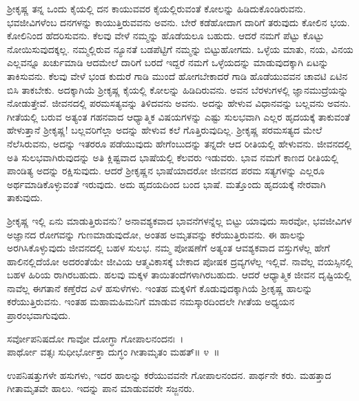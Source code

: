 ಶ‍್ರೀಕೃಷ್ಣ ತನ್ನ ಒಂದು ಕೈಯಲ್ಲಿ ದನ ಕಾಯುವವರ ಕೈಯಲ್ಲಿರುವಂತೆ ಕೋಲನ್ನು ಹಿಡಿದು\-ಕೊಂಡಿರುವನು. ಭವಜೀವಿಗಳೆಂಬ ದನಗಳನ್ನು ಕಾಯುತ್ತಿರುವವನು ಅವನು. ಬೇರೆ ಕಡೆ\break ಹೋದಾಗ ದಾರಿಗೆ ತರುವುದು ಕೋಲಿನ ಭಯ. ಕೋಲಿನಿಂದ ಹೆದರಿಸುವನು. ಕೆಲವು ವೇಳೆ ನಮ್ಮನ್ನು ಹೊಡೆಯಲೂ ಬಹುದು. ಆದರೆ ನಮಗೆ ಪೆಟ್ಟು ಕೊಟ್ಟು ನೋಯಿಸುವುದಕ್ಕಲ್ಲ. ನಮ್ಮಲ್ಲಿರುವ ನ್ಯೂನತೆ ಬಡಪೆಟ್ಟಿಗೆ ನಮ್ಮನ್ನು ಬಿಟ್ಟುಹೋಗದು. ಒಳ್ಳೆಯ ಮಾತು, ನಯ, ವಿನಯ ಎಲ್ಲವನ್ನೂ ಖರ್ಚುಮಾಡಿ ಆದಮೇಲೆ ದಾರಿಗೆ ಬರದೆ ಇದ್ದರೆ ನಮಗೆ ಒಳ್ಳೆಯದನ್ನು ಮಾಡುವುದಕ್ಕಾಗಿ ಏಟನ್ನು ತಾಕಿಸುವನು. ಕೆಲವು ವೇಳೆ ಭಂಡ ಕುದುರೆ ಗಾಡಿ ಮುಂದೆ ಹೋಗಬೇಕಾದರೆ ಗಾಡಿ ಹೊಡೆಯುವವನ ಚಾವಟಿ ಏಟಿನ ಬಿಸಿ ತಾಕಬೇಕು. ಅದಕ್ಕಾಗಿಯೆ ಶ‍್ರೀಕೃಷ್ಣ ಕೈಯಲ್ಲಿ ಕೋಲನ್ನು ಹಿಡಿದಿರುವನು. ಅವನ ಬೆರಳುಗಳಲ್ಲಿ ಜ್ಞಾನಮುದ್ರೆಯನ್ನು ನೋಡುತ್ತೇವೆ. ಜೀವನದಲ್ಲಿ ಪರಮಸತ್ಯವನ್ನು ತಿಳಿದವನು ಅವನು. ಅದನ್ನು ಹೇಳುವ ವಿಧಾನವನ್ನು ಬಲ್ಲವನು ಅವನು. ಗೀತೆಯಲ್ಲಿ ಬರುವ ಅತ್ಯಂತ ಗಹನವಾದ ಆಧ್ಯಾತ್ಮಿಕ ವಿಷಯಗಳನ್ನು ಎಷ್ಟು ಸುಲಭವಾಗಿ ಎಲ್ಲರ ಹೃದಯಕ್ಕೆ ತಾಕುವಂತೆ ಹೇಳುತ್ತಾನೆ ಶ‍್ರೀಕೃಷ್ಣ! ಬಲ್ಲವರಿಗೆಲ್ಲಾ ಅದನ್ನು ಹೇಳುವ ಕಲೆ ಗೊತ್ತಿರುವುದಿಲ್ಲ. ಶ‍್ರೀಕೃಷ್ಣ ಪರಮಸತ್ಯದ ಮೇಲೆ ನೆಲೆಸಿರುವನು, ಅದನ್ನು ಇತರರೂ ಪಡೆಯುವುದು ಹೇಗೆಂಬುದನ್ನು ತನ್ನದೇ ಆದ ರೀತಿಯಲ್ಲಿ ಹೇಳುವನು. ಜೀವನದಲ್ಲಿ ಅತಿ ಸುಲಭವಾಗಿರುವುದನ್ನು ಅತಿ ಕ್ಲಿಷ್ಟವಾದ ಭಾಷೆಯಲ್ಲಿ ಕೆಲವರು ಇಡುವರು. ಭಾವ ನಮಗೆ ಕಾಣದ ರೀತಿಯಲ್ಲಿ ಪಾಂಡಿತ್ಯ ಅದನ್ನು ರಕ್ಷಿಸುವುದು. ಆದರೆ ಶ‍್ರೀಕೃಷ್ಣನ ಭಾಷೆಯಾದರೋ ಜೀವನದ ಪರಮ ಸತ್ಯಗಳನ್ನು ಎಲ್ಲರೂ ಅರ್ಥಮಾಡಿಕೊಳ್ಳುವಂತೆ ಇರುವುದು. ಅದು ಹೃದಯದಿಂದ ಬಂದ ಭಾಷೆ. ಮತ್ತೊಂದು ಹೃದಯಕ್ಕೆ ನೇರವಾಗಿ ತಾಕುವುದು.

\newpage

ಶ‍್ರೀಕೃಷ್ಣ ಇಲ್ಲಿ ಏನು ಮಾಡುತ್ತಿರುವನು? ಅನಾವಶ್ಯಕವಾದ ಭಾವನೆಗಳನ್ನೆಲ್ಲ ಬಿಟ್ಟು ಯಾವುದು ಸಾರವೋ, ಭವಜೀವಿಗಳ ಅಜ್ಞಾನದ ರೋಗವನ್ನು ಗುಣಮಾಡುವುದೋ, ಅಂತಹ ಅಮೃತವನ್ನು ಕರೆಯುತ್ತಿರುವನು. ಈ ಹಾಲನ್ನು ಅರಗಿಸಿಕೊಳ್ಳುವುದು ಜೀವನದಲ್ಲಿ ಬಹಳ ಸುಲಭ. ನಮ್ಮ ಪೋಷಣೆಗೆ ಅತ್ಯಂತ ಆವಶ್ಯಕವಾದ ವಸ್ತುಗಳೆಲ್ಲ ಹೇಗೆ ಹಾಲಿನಲ್ಲಿದೆಯೋ ಅದರಂತೆಯೇ ಜೀವಿಯ ಆತ್ಮವಿಕಾಸಕ್ಕೆ ಬೇಕಾದ ಪೋಷಕ ದ್ರವ್ಯಗಳೆಲ್ಲ ಇಲ್ಲಿವೆ. ನಾವೆಲ್ಲ ವಯಸ್ಸಿನಲ್ಲಿ ಬಹಳ ಹಿರಿಯ ರಾಗಿರಬಹುದು. ಹಲವು ಮಕ್ಕಳ ತಾಯಿತಂದೆಗಳಾಗಿರಬಹುದು. ಆದರೆ ಆಧ್ಯಾತ್ಮಿಕ ಜೀವನ ದೃಷ್ಟಿಯಲ್ಲಿ ನಾವೆಲ್ಲ ಈಗತಾನೆ ಕಣ್ತೆರೆದ ಎಳೆ ಹಸುಳೆಗಳು. ಇಂತಹ ಮಕ್ಕಳಿಗೆ ಕೊಡುವುದಕ್ಕಾಗಿಯೆ ಶ‍್ರೀಕೃಷ್ಣ ಹಾಲನ್ನು ಕರೆಯುತ್ತಿರುವನು. ಇಂತಹ ಮಹಾಮಹಿಮನಿಗೆ ಮಾಡುವ ನಮಸ್ಕಾರದಿಂದಲೇ ಗೀತೆಯ ಅಧ್ಯಯನ ಪ್ರಾರಂಭವಾಗುವುದು.

\begin{shloka}
ಸರ್ವೋಪನಿಷದೋ ಗಾವೋ ದೋಗ್ಧಾ ಗೋಪಾಲನಂದನಃ~।\\ ಪಾರ್ಥೋ ವತ್ಸಃ ಸುಧೀರ್ಭೋಕ್ತಾ ದುಗ್ಧಂ ಗೀತಾಮೃತಂ ಮಹತ್\hfill॥ ೪~॥
\end{shloka}

\begin{artha}
ಉಪನಿಷತ್ತುಗಳೇ ಹಸುಗಳು, ಇದರ ಹಾಲನ್ನು ಕರೆಯುವವನೇ ಗೋಪಾಲನಂದನ. ಪಾರ್ಥನೇ ಕರು. ಮಹತ್ತಾದ ಗೀತಾಮೃತವೇ ಹಾಲು. ಇದನ್ನು ಪಾನ ಮಾಡುವವರೇ ಸಜ್ಜನರು.
\end{artha}

